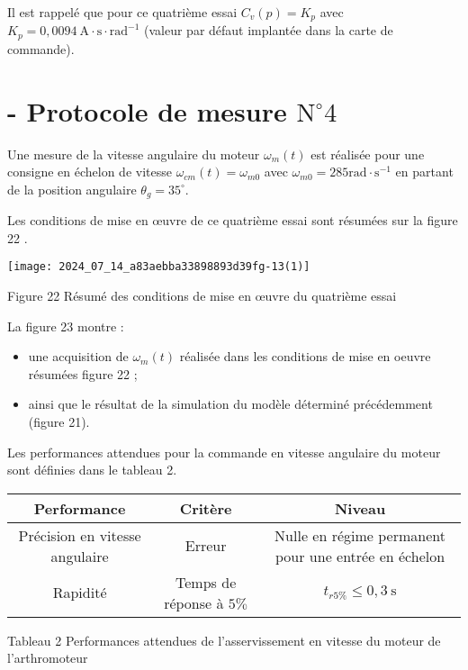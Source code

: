 Il est rappelé que pour ce quatrième essai $C_{v}(p)=K_{p}$ avec $K_{p}=0,0094 \mathrm{~A} \cdot \mathrm{s} \cdot \mathrm{rad}^{-1}$ (valeur par défaut implantée dans la carte de commande).

\section*{- Protocole de mesure $\mathrm{N}^{\circ} 4$}
Une mesure de la vitesse angulaire du moteur $\omega_{m}(t)$ est réalisée pour une consigne en échelon de vitesse $\omega_{c m}(t)=\omega_{m 0}$ avec $\omega_{m 0}=285 \mathrm{rad} \cdot \mathrm{s}^{-1}$ en partant de la position angulaire $\theta_{g}=35^{\circ}$.

Les conditions de mise en œuvre de ce quatrième essai sont résumées sur la figure 22 .

\begin{center}
\texttt{[image: 2024\_07\_14\_a83aebba33898893d39fg-13(1)]}
\end{center}

Figure 22 Résumé des conditions de mise en œuvre du quatrième essai

La figure 23 montre :

\begin{itemize}
  \item une acquisition de $\omega_{m}(t)$ réalisée dans les conditions de mise en oeuvre résumées figure 22 ;

  \item ainsi que le résultat de la simulation du modèle déterminé précédemment (figure 21).

\end{itemize}

Les performances attendues pour la commande en vitesse angulaire du moteur sont définies dans le tableau 2.

\begin{center}
\begin{tabular}{|c|c|c|}
\hline
Performance & Critère & Niveau \\
\hline
Précision en vitesse angulaire & Erreur & Nulle en régime permanent pour une entrée en échelon \\
\hline
Rapidité & Temps de réponse à $5 \%$ & $t_{r 5 \%} \leqslant 0,3 \mathrm{~s}$ \\
\hline
\end{tabular}
\end{center}

Tableau 2 Performances attendues de l'asservissement en vitesse du moteur de l'arthromoteur

